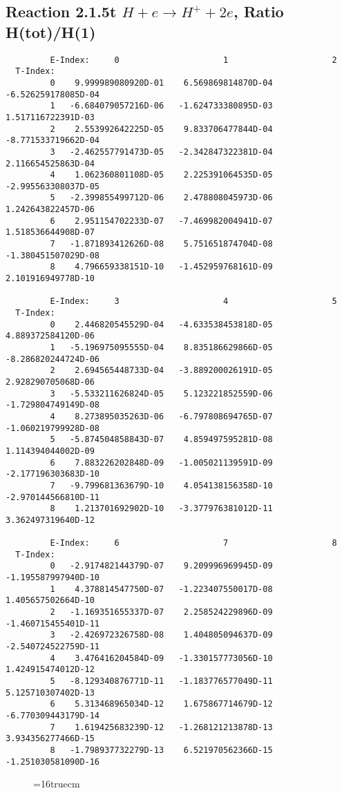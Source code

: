 \documentclass[12pt]{article}
\begin{document}
\newpage
\subsection{
Reaction 2.1.5t $ H + e \rightarrow H^+ + 2e$, Ratio H(tot)/H(1)
}



\begin{small}\begin{verbatim}
         E-Index:     0                     1                     2
  T-Index:
         0    9.999989080920D-01    6.569869814870D-04   -6.526259178085D-04
         1   -6.684079057216D-06   -1.624733380895D-03    1.517116722391D-03
         2    2.553992642225D-05    9.833706477844D-04   -8.771533719662D-04
         3   -2.462557791473D-05   -2.342847322381D-04    2.116654525863D-04
         4    1.062360801108D-05    2.225391064535D-05   -2.995563308037D-05
         5   -2.399855499712D-06    2.478808045973D-06    1.242643822457D-06
         6    2.951154702233D-07   -7.469982004941D-07    1.518536644908D-07
         7   -1.871893412626D-08    5.751651874704D-08   -1.380451507029D-08
         8    4.796659338151D-10   -1.452959768161D-09    2.101916949778D-10

         E-Index:     3                     4                     5
  T-Index:
         0    2.446820545529D-04   -4.633538453818D-05    4.889372584120D-06
         1   -5.196975095555D-04    8.835186629866D-05   -8.286820244724D-06
         2    2.694565448733D-04   -3.889200026191D-05    2.928290705068D-06
         3   -5.533211626824D-05    5.123221852559D-06   -1.729804749149D-08
         4    8.273895035263D-06   -6.797808694765D-07   -1.060219799928D-08
         5   -5.874504858843D-07    4.859497595281D-08    1.114394044002D-09
         6    7.883226202848D-09   -1.005021139591D-09   -2.177196303683D-10
         7   -9.799681363679D-10    4.054138156358D-10   -2.970144566810D-11
         8    1.213701692902D-10   -3.377976381012D-11    3.362497319640D-12

         E-Index:     6                     7                     8
  T-Index:
         0   -2.917482144379D-07    9.209996969945D-09   -1.195587997940D-10
         1    4.378814547750D-07   -1.223407550017D-08    1.405657502664D-10
         2   -1.169351655337D-07    2.258524229896D-09   -1.460715455401D-11
         3   -2.426972326758D-08    1.404805094637D-09   -2.540724522759D-11
         4    3.476416204584D-09   -1.330157773056D-10    1.424915474012D-12
         5   -8.129340876771D-11   -1.183776577049D-11    5.125710307402D-13
         6    5.313468965034D-12    1.675867714679D-12   -6.770309443179D-14
         7    1.619425683239D-12   -1.268121213878D-13    3.934356277466D-15
         8   -1.798937732279D-13    6.521970562366D-15   -1.251030581090D-16

\end{verbatim}\end{small}
\begin{figure} \label{2.1.5t}
\epsfxsize=16truecm
\end{figure}
\end{document}
